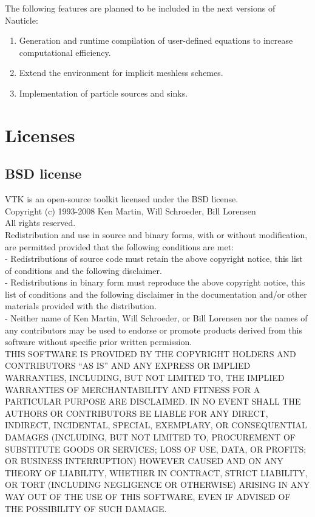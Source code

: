 \documentclass[a4paper,12pt,openany]{book}
\theoremstyle{break}
\begin{document}
The following features are planned to be included in the next versions of Nauticle:
\begin{enumerate}
\item Generation and runtime compilation of user-defined equations to increase computational efficiency.
\item Extend the environment for implicit meshless schemes.
\item Implementation of particle sources and sinks.
\end{enumerate}


\renewcommand{\bibname}{References}


\newpage
\section{Licenses}
\subsection{BSD license}
VTK is an open-source toolkit licensed under the BSD license.\\
Copyright (c) 1993-2008 Ken Martin, Will Schroeder, Bill Lorensen \\
All rights reserved.\\
Redistribution and use in source and binary forms, with or without modification, are permitted provided that the following conditions are met: \\
- Redistributions of source code must retain the above copyright notice, this list of conditions and the following disclaimer. \\
- Redistributions in binary form must reproduce the above copyright notice, this list of conditions and the following disclaimer in the documentation and/or other materials provided with the distribution. \\
- Neither name of Ken Martin, Will Schroeder, or Bill Lorensen nor the names of any contributors may be used to endorse or promote products derived from this software without specific prior written permission.\\

THIS SOFTWARE IS PROVIDED BY THE COPYRIGHT HOLDERS AND CONTRIBUTORS “AS IS” AND ANY EXPRESS OR IMPLIED WARRANTIES, INCLUDING, BUT NOT LIMITED TO, THE IMPLIED WARRANTIES OF MERCHANTABILITY AND FITNESS FOR A PARTICULAR PURPOSE ARE DISCLAIMED. IN NO EVENT SHALL THE AUTHORS OR CONTRIBUTORS BE LIABLE FOR ANY DIRECT, INDIRECT, INCIDENTAL, SPECIAL, EXEMPLARY, OR CONSEQUENTIAL DAMAGES (INCLUDING, BUT NOT LIMITED TO, PROCUREMENT OF SUBSTITUTE GOODS OR SERVICES; LOSS OF USE, DATA, OR PROFITS; OR BUSINESS INTERRUPTION) HOWEVER CAUSED AND ON ANY THEORY OF LIABILITY, WHETHER IN CONTRACT, STRICT LIABILITY, OR TORT (INCLUDING NEGLIGENCE OR OTHERWISE) ARISING IN ANY WAY OUT OF THE USE OF THIS SOFTWARE, EVEN IF ADVISED OF THE POSSIBILITY OF SUCH DAMAGE.
\end{document}

